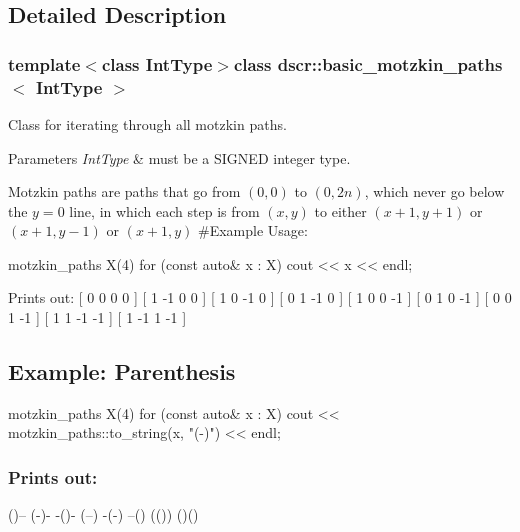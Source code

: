\subsection{Detailed Description}
\subsubsection*{template$<$class Int\-Type$>$class dscr\-::basic\-\_\-motzkin\-\_\-paths$<$ Int\-Type $>$}

Class for iterating through all motzkin paths. 


\begin{DoxyParams}{Parameters}
{\em Int\-Type} & must be a S\-I\-G\-N\-E\-D integer type.\\
\hline
\end{DoxyParams}
Motzkin paths are paths that go from $(0,0)$ to $(0,2n)$, which never go below the $ y=0$ line, in which each step is from $(x,y)$ to either $(x+1,y+1)$ or $(x+1,y-1)$ or $(x+1,y)$ \#\-Example Usage\-: \begin{DoxyVerb}motzkin_paths X(4)
for (const auto& x : X)
    cout << x << endl;
\end{DoxyVerb}
 Prints out\-: \mbox{[} 0 0 0 0 \mbox{]} \mbox{[} 1 -\/1 0 0 \mbox{]} \mbox{[} 1 0 -\/1 0 \mbox{]} \mbox{[} 0 1 -\/1 0 \mbox{]} \mbox{[} 1 0 0 -\/1 \mbox{]} \mbox{[} 0 1 0 -\/1 \mbox{]} \mbox{[} 0 0 1 -\/1 \mbox{]} \mbox{[} 1 1 -\/1 -\/1 \mbox{]} \mbox{[} 1 -\/1 1 -\/1 \mbox{]}

\subsection*{Example\-: Parenthesis}

\begin{DoxyVerb}motzkin_paths X(4)
for (const auto& x : X)
    cout << motzkin_paths::to_string(x, "(-)") << endl;
\end{DoxyVerb}


\subsubsection*{Prints out\-: }

()-- (-\/)-\/ -\/()-\/ (--) -\/(-\/) --() (()) ()() 

